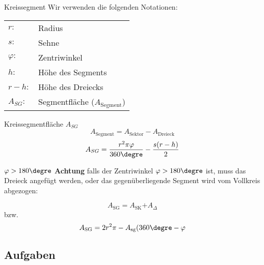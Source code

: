 \begin{definition}{Kreissegment}{}
  Wir verwenden die folgenden Notationen:
  \begin{tabular}{ll}
    $r:$        & Radius \\
    $s:$        & Sehne  \\
    $\varphi: $ & Zentriwinkel \\
    $h:$        & Höhe des Segments\\
    $r-h:$      & Höhe des Dreiecks \\
    $A_{SG}:$    & Segmentfläche ($A_{\text{Segment}}$)
    \end{tabular}  
\end{definition}

\begin{gesetz}{Kreissegmentfläche $A_{SG}$}{}
  $$A_{\text{Segment}} = A_{\text{Sektor}} - A_{\text{Dreieck}}$$
  $$A_{SG} = \frac{r^2\pi\varphi}{360\degre} - \frac{s(r-h)}{2}$$
\end{gesetz}

\begin{bemerkung}{$\varphi>180\degre$}{}
\textbf{Achtung} falls der Zentriwinkel $\varphi > 180\degre$ ist, muss
das Dreieck angefügt werden, oder das gegenüberliegende Segment wird
vom Vollkreis abgezogen:

$$A_{\text{SG}} = A_{\text{SK}} \textbf{+} A_{\Delta}$$
bzw.
$$A_{\text{SG}} = 2r^2\pi - A_{\text{sg}}(360\degre -\varphi$$

\end{bemerkung}



\newpage



\subsection*{Aufgaben}










\newpage
